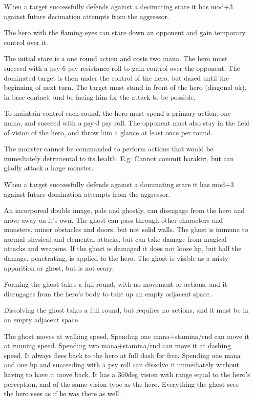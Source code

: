 When a target successfully defends against a decimating stare it has mod+3 against future decimation attempts from the aggressor.


 The hero with the flaming eyes can stare down an opponent and gain temporary control over it.

The initial stare is a one round action and costs two mana. The hero must succeed with a psy-6 \vs psy resistance roll to gain control over the opponent. The dominated target is then under the control of the hero, but dazed until the beginning of next turn. The target must stand in front of the hero (diagonal ok), in base contact, and be facing him for the attack to be possible.

To maintain control each round, the hero must spend a primary action, one mana, and succeed with a psy-3 \vs psy roll. The opponent must also stay in the field of vision of the hero, and throw him a glance at least once per round.

The monster cannot be commanded to perform actions that would be immediately detrimental to its health. E.g: Cannot commit harakiri, but can gladly attack a large monster.

When a target successfully defends against a dominating stare it has mod+3 against future domination attempts from the aggressor.


 An incorporeal double image, pale and ghostly, can disengage from the hero and move away on it's own. The ghost can pass through other characters and monsters, minor obstacles and doors, but not solid walls. The ghost is immune to normal physical and elemental attacks, but can take damage from magical attacks and weapons. If the ghost is damaged it does not loose hp, but half the damage, penetrating, is applied to the hero. The ghost is visible as a misty apparition or ghost, but is not scary.

Forming the ghost takes a full round, with no movement or actions, and it disengages from the hero's body to take up an empty adjacent space.

Dissolving the ghost takes a full round, but requires no actions, and it must be in an empty adjacent space.

The ghost moves at walking speed. Spending one mana+stamina/rnd can move it at running speed. Spending two mana+stamina/rnd can move it at dashing speed. It always flees back to the hero at full dash for free. Spending one mana and one hp and succeeding with a psy roll can dissolve it immediately without having to have it move back.
It has a 360deg vision with range equal to the hero's perception, and of the same vision type as the hero. Everything the ghost sees the hero sees as if he was there as well.

